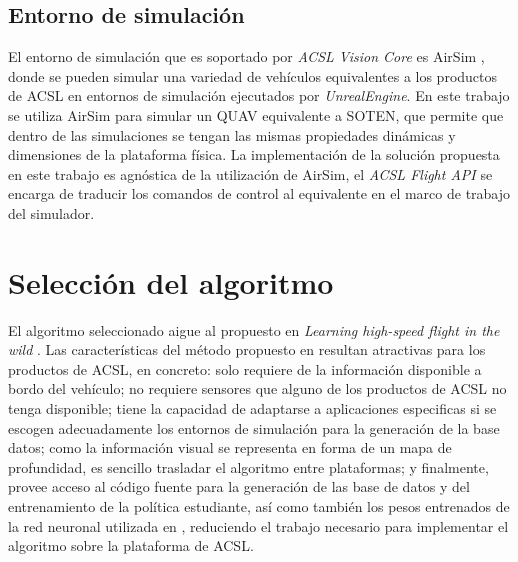 \subsection{Entorno de simulación}

El entorno de simulación que es soportado por \textit{ACSL Vision Core} es AirSim \cite{shah2018airsim}, donde se pueden simular una variedad de vehículos equivalentes a los productos de ACSL en entornos de simulación ejecutados por \textit{UnrealEngine}. En este trabajo se utiliza AirSim para simular un QUAV equivalente a SOTEN, que permite que dentro de las simulaciones se tengan las mismas propiedades dinámicas y dimensiones de la plataforma física. La implementación de la solución propuesta en este trabajo es agnóstica de la utilización de AirSim, el \textit{ACSL Flight API} se encarga de traducir los comandos de control al equivalente en el marco de trabajo del simulador.

\section{Selección del algoritmo}

\label{sec:imp-algo}

El algoritmo seleccionado aigue al propuesto en \textit{Learning high-speed flight in the wild} \cite{Loquercio2021}. Las características del método propuesto en \cite{Loquercio2021} resultan atractivas para los productos de ACSL, en concreto: solo requiere de la información disponible a bordo del vehículo; no requiere sensores que alguno de los productos de ACSL no tenga disponible; tiene la capacidad de adaptarse a aplicaciones especificas si se escogen adecuadamente los entornos de simulación para la generación de la base datos; como la información visual se representa en forma de un mapa de profundidad, es sencillo trasladar el algoritmo entre plataformas; y finalmente, \cite{Loquercio2021} provee acceso al código fuente para la generación de las base de datos y del entrenamiento de la política estudiante, así como también los pesos entrenados de la red neuronal utilizada en \cite{Loquercio2021}, reduciendo el trabajo necesario para implementar el algoritmo sobre la plataforma de ACSL.


